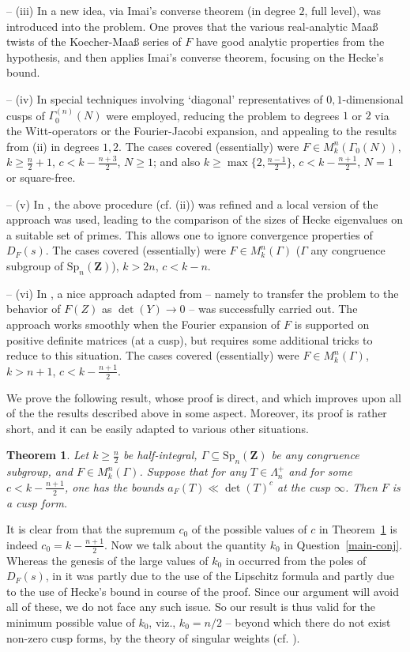 \documentclass[12pt]{amsart}
\numberwithin{equation}{section}
\theoremstyle{plain}
\newtheorem{thm}{Theorem}[section]
\newcommand{\thmref}[1]{Theorem~\ref{#1}}
\theoremstyle{definition}
\newcommand{\qsref}[1]{Question~\ref{#1}}
\newcommand{\mf}{\mathbf}
\newcommand{\mrm}{\mathrm}
\newcommand{\spn}{\mrm{Sp}_n(\mf Z)}
\newcommand{\mkngam}{M^n_k(\Gamma)}
\begin{document}
-- (iii) In \cite{mizuno} a new idea, via Imai's converse theorem (in degree $2$, full level), was introduced into the problem. One proves that the various real-analytic Maa{\ss} twists of the Koecher-Maa{\ss} series of $F$ have good analytic properties from the hypothesis, and then applies Imai's converse theorem, focusing on the Hecke's bound.

-- (iv) In \cite{bo-das3} special techniques involving `diagonal' representatives of $0,1$-dimensional cusps of $\Gamma^{(n)}_0(N)$ were employed, reducing the problem to degrees $1$ or $2$ via the Witt-operators or the Fourier-Jacobi expansion, and appealing to the results from (ii) in degrees $1,2$. The cases covered (essentially) were $F\in M^n_k(\Gamma_0(N))$, $k \ge \frac{n}{2}+1$, $c< k-\frac{n+3}{2}$, $N \ge 1$; and also $k \ge \max\{ 2, \frac{n-1}{2} \}$, $c< k-\frac{n+1}{2}$, $N =1$ or square-free.

-- (v) In \cite{bo-das2}, the above procedure (cf. (ii)) was refined and a local version of the approach was used, leading to the comparison of the sizes of Hecke eigenvalues on a suitable set of primes. This allows one to ignore convergence properties of $D_F(s)$. The cases covered (essentially) were $F\in \mkngam$ ($\Gamma$ any congruence subgroup of $\spn$), $k >2n$, $c< k-n$.

-- (vi) In \cite{bo-ko}, a nice approach adapted from \cite{miyake} -- namely to transfer the problem to the behavior of $F(Z)$ as $\det(Y) \to 0$ -- was successfully carried out. The approach works smoothly when the Fourier expansion of $F$ is supported on positive definite matrices (at a cusp), but requires some additional tricks to reduce to this situation.
The cases covered (essentially) were $F\in\mkngam$, $k > n+1$, $c< k-\frac{n+1}{2}$.

We prove the following result, whose proof is direct, and which improves upon all of the the results described above in some aspect. Moreover, its proof is rather short, and it can be easily adapted to various other situations.

\begin{thm} \label{mainthm}
    Let $k \ge \frac{n}{2}$ be half-integral, $\Gamma \subseteq \spn$ be any congruence subgroup, and $F \in M^n_k(\Gamma)$. Suppose that for any $T \in \Lambda_n^+$ and for some $c< k - \frac{n+1}{2}$, one has the bounds $a_F(T) \ll \det(T)^c$ at the cusp $\infty$. Then $F$ is a cusp form.
\end{thm}

It is clear from \cite[Remark~5.3]{bo-das1} that the supremum $c_0$ of the possible values of $c$ in \thmref{mainthm} is indeed $\displaystyle c_0=k-\frac{n+1}{2}$. Now we talk about the quantity $k_0$ in \qsref{main-conj}. Whereas the genesis of the large values of $k_0$ in \cite{bo-das1} occurred from the poles of $D_F(s)$, in \cite{bo-ko} it was partly due to the use of the Lipschitz formula and partly due to the use of Hecke's bound in course of the proof. Since our argument will avoid all of these, we do not face any such issue. So our result is thus valid for the minimum possible value of $k_0$, viz., $k_0=n/2$ -- beyond which there do not exist non-zero cusp forms, by the theory of singular weights (cf. \cite{freitag}).
\end{document}
